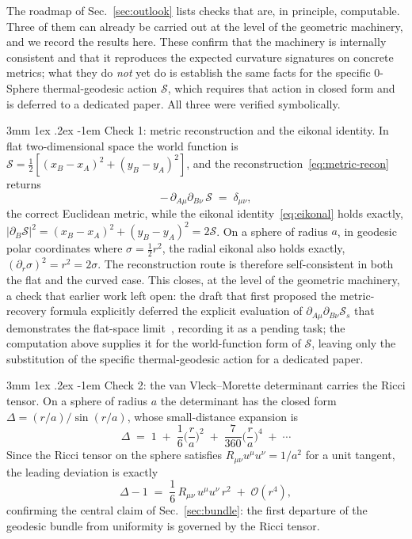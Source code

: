 \documentclass[%
 reprint, amsmath,amssymb, aps, prb, ]{revtex4-2}
\makeatletter
\numberwithin{equation}{section}
\renewcommand\paragraph{%
  \@startsection{paragraph}{4}{\z@}%
    {3mm \@plus 1ex \@minus .2ex}%
    {-1em}%
    {\normalfont\normalsize\itshape}}
\makeatother
\begin{document}
The roadmap of Sec.~\ref{sec:outlook} lists checks that are, in principle, computable. Three of them can already be carried out at the level of the geometric machinery, and we record the results here. These confirm that the machinery is internally consistent and that it reproduces the expected curvature signatures on concrete metrics; what they do \emph{not} yet do is establish the same facts for the specific 0-Sphere thermal-geodesic action $\mathcal{S}$, which requires that action in closed form and is deferred to a dedicated paper. All three were verified symbolically.

\paragraph{Check 1: metric reconstruction and the eikonal identity.}
In flat two-dimensional space the world function is $\mathcal{S}=\tfrac12[(x_B-x_A)^2+(y_B-y_A)^2]$, and the reconstruction~\eqref{eq:metric-recon} returns
\begin{equation}
-\,\partial_{A\mu}\partial_{B\nu}\,\mathcal{S} \;=\; \delta_{\mu\nu},
\label{eq:check1-metric}
\end{equation}
the correct Euclidean metric, while the eikonal identity~\eqref{eq:eikonal} holds exactly, $|\partial_B\mathcal{S}|^2=(x_B-x_A)^2+(y_B-y_A)^2=2\mathcal{S}$. On a sphere of radius $a$, in geodesic polar coordinates where $\sigma=\tfrac12 r^2$, the radial eikonal also holds exactly, $(\partial_r\sigma)^2=r^2=2\sigma$. The reconstruction route is therefore self-consistent in both the flat and the curved case. This closes, at the level of the geometric machinery, a check that earlier work left open: the draft that first proposed the metric-recovery formula explicitly deferred the explicit evaluation of $\partial_{A\mu}\partial_{B\nu}\mathcal{S}_s$ that demonstrates the flat-space limit~\cite{hanamura51}, recording it as a pending task; the computation above supplies it for the world-function form of $\mathcal{S}$, leaving only the substitution of the specific thermal-geodesic action for a dedicated paper.

\paragraph{Check 2: the van Vleck--Morette determinant carries the Ricci tensor.}
On a sphere of radius $a$ the determinant has the closed form $\Delta=(r/a)/\sin(r/a)$, whose small-distance expansion is
\begin{equation}
\Delta \;=\; 1 \;+\; \frac{1}{6}\Big(\frac{r}{a}\Big)^2 \;+\; \frac{7}{360}\Big(\frac{r}{a}\Big)^4 \;+\; \cdots
\label{eq:check2-expand}
\end{equation}
Since the Ricci tensor on the sphere satisfies $R_{\mu\nu}u^\mu u^\nu=1/a^2$ for a unit tangent, the leading deviation is exactly
\begin{equation}
\Delta - 1 \;=\; \frac{1}{6}\,R_{\mu\nu}\,u^\mu u^\nu\,r^2 \;+\; \mathcal{O}(r^4),
\label{eq:check2-ricci}
\end{equation}
confirming the central claim of Sec.~\ref{sec:bundle}: the first departure of the geodesic bundle from uniformity is governed by the Ricci tensor.
\end{document}
